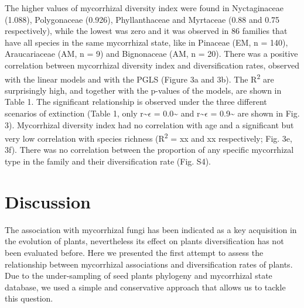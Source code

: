 \documentclass[12pt,]{article}
\begin{document}
The higher values of mycorrhizal diversity index were found in
Nyctaginaceae (1.088), Polygonaceae (0.926), Phyllanthaceae and
Myrtaceae (0.88 and 0.75 respectively), while the lowest was zero and it
was observed in 86 families that have all species in the same
mycorrhizal state, like in Pinaceae (EM, n = 140), Araucariaceae (AM, n
= 9) and Bignonaceae (AM, n = 20). There was a positive correlation
between mycorrhizal diversity index and diversification rates, observed
with the linear models and with the PGLS (Figure 3a and 3b). The
R\textsuperscript{2} are surprisingly high, and together with the
p-values of the models, are shown in Table 1. The significant
relationship is observed under the three different scenarios of
extinction (Table 1, only r\textasciitilde{}\(\epsilon\) =
0.0\textasciitilde{} and r\textasciitilde{}\(\epsilon\) =
0.9\textasciitilde{} are shown in Fig. 3). Mycorrhizal diversity index
had no correlation with age and a significant but very low correlation
with species richness (R\textsuperscript{2} = xx and xx respectively;
Fig. 3e, 3f). There was no correlation between the proportion of any
specific mycorrhizal type in the family and their diversification rate
(Fig. S4).

\hypertarget{discussion}{%
\section{Discussion}\label{discussion}}

The association with mycorrhizal fungi has been indicated as a key
acquisition in the evolution of plants, nevertheless its effect on
plants diversification has not been evaluated before. Here we presented
the first attempt to assess the relationship between mycorrhizal
associations and diversification rates of plants. Due to the
under-sampling of seed plants phylogeny and mycorrhizal state database,
we used a simple and conservative approach that allows us to tackle this
question.
\end{document}
